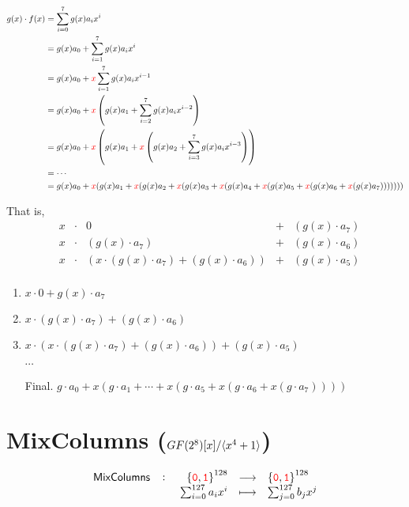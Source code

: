 \begin{align*}
	g(x)\cdot f(x) &= \sum_{i=0}^7g(x)a_ix^i \\
	&= g(x)a_0 + \sum_{i=1}^7g(x)a_ix^i \\
	&= g(x)a_0 + \textcolor{red}{x}\sum_{i=1}^7g(x)a_ix^{i-1} \\
	&= g(x)a_0 + \textcolor{red}{x}\left(g(x)a_1 + \sum_{i=2}^7g(x)a_ix^{i-2}\right) \\
	&= g(x)a_0 + \textcolor{red}{x}\left(g(x)a_1 + \textcolor{red}{x}\left(g(x)a_2 + \sum_{i=3}^7g(x)a_ix^{i-3}\right)\right) \\
	&= \cdots \\
	&= g(x)a_0 + \textcolor{red}{x}(g(x)a_1 + \textcolor{red}{x}(g(x)a_2 + \textcolor{red}{x}(g(x)a_3 + \textcolor{red}{x}(g(x)a_4 + \textcolor{red}{x}(g(x)a_5 + \textcolor{red}{x}(g(x)a_6 + \textcolor{red}{x}(g(x)a_7)))))))
\end{align*}

That is, \begin{align*}
	&x &\cdot& 0 & + & (g(x)\cdot a_7)\\
	&x &\cdot& (g(x)\cdot a_7) & + & (g(x)\cdot a_6)\\
	&x &\cdot& (x\cdot (g(x)\cdot a_7) + (g(x)\cdot a_6)) & + & (g(x)\cdot a_5)\\
\end{align*}\begin{enumerate}[Step 1.]
	\item $x\cdot 0 + g(x)\cdot a_7$
	\item $x\cdot (g(x)\cdot a_7) + (g(x)\cdot a_6)$
	\item $x\cdot (x\cdot (g(x)\cdot a_7) + (g(x)\cdot a_6)) + (g(x)\cdot a_5)$
	\item[] $\cdots$
	\item[Final.] $g\cdot a_0 + x(g\cdot a_1 + \cdots + x(g\cdot a_5 + x(g\cdot a_6 + x(g\cdot a_7))))$
\end{enumerate}



%

\newpage

\section{MixColumns ($GF(2^8)[x]/\langle x^4+1 \rangle$)}
\[
\fullfunction{\textsf{MixColumns}}{\binaryfield^{128}}{\binaryfield^{128}}{\sum_{i=0}^{127}a_ix^i}{\sum_{j=0}^{127}b_jx^j}
\]

